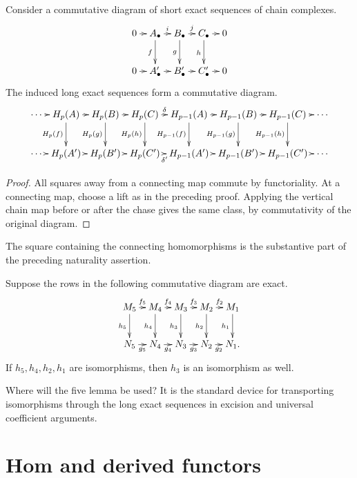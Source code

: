 \begin{theorem}
\label{at-theorem-connecting-naturality}
Consider a commutative diagram of short
exact sequences of chain complexes.
$$
\xymatrix@C=.7em{
0 \ar[r]
  & A_\bullet \ar[r]^-i \ar[d]_f
  & B_\bullet \ar[r]^-j \ar[d]_g
  & C_\bullet \ar[r] \ar[d]_h
  & 0 \\
0 \ar[r]
  & A'_\bullet \ar[r]
  & B'_\bullet \ar[r]
  & C'_\bullet \ar[r]
  & 0
}
$$
The induced long exact sequences form a
commutative diagram.
$$
\xymatrix@C=.35em@R=2.4em{
\cdots \ar[r]
  & H_p(A) \ar[r] \ar[d]_{H_p(f)}
  & H_p(B) \ar[r] \ar[d]_{H_p(g)}
  & H_p(C)
    \ar[r]^-\delta
    \ar[d]_{H_p(h)}
  & H_{p-1}(A)
    \ar[r]
    \ar[d]_{H_{p-1}(f)}
  & H_{p-1}(B)
    \ar[r]
    \ar[d]_{H_{p-1}(g)}
  & H_{p-1}(C)
    \ar[r]
    \ar[d]_{H_{p-1}(h)}
  & \cdots \\
\cdots \ar[r]
  & H_p(A') \ar[r]
  & H_p(B') \ar[r]
  & H_p(C') \ar[r]_-{\delta'}
  & H_{p-1}(A') \ar[r]
  & H_{p-1}(B') \ar[r]
  & H_{p-1}(C') \ar[r]
  & \cdots
}
$$
\end{theorem}

\begin{proof}
All squares away from a connecting map
commute by functoriality.  At a connecting
map, choose a lift as in the preceding
proof.  Applying the vertical chain map
before or after the chase gives the same
class, by commutativity of the original
diagram.
\end{proof}

The square containing the connecting
homomorphisms is the substantive part of
the preceding naturality assertion.

\begin{lemma}
\label{at-lemma-five}
Suppose the rows in the following
commutative diagram are exact.
$$
\xymatrix@C=.65em{
M_5 \ar[r]^-{f_5} \ar[d]_{h_5}
  & M_4 \ar[r]^-{f_4} \ar[d]_{h_4}
  & M_3 \ar[r]^-{f_3} \ar[d]_{h_3}
  & M_2 \ar[r]^-{f_2} \ar[d]_{h_2}
  & M_1 \ar[d]_{h_1} \\
N_5 \ar[r]_-{g_5}
  & N_4 \ar[r]_-{g_4}
  & N_3 \ar[r]_-{g_3}
  & N_2 \ar[r]_-{g_2}
  & N_1.
}
$$
If $h_5,h_4,h_2,h_1$ are isomorphisms,
then $h_3$ is an isomorphism as well.
\end{lemma}


Where will the five lemma be used? It is
the standard device for transporting
isomorphisms through the long exact
sequences in excision and universal
coefficient arguments.
\section{Hom and derived functors}
\label{at-section-hom-derived}

